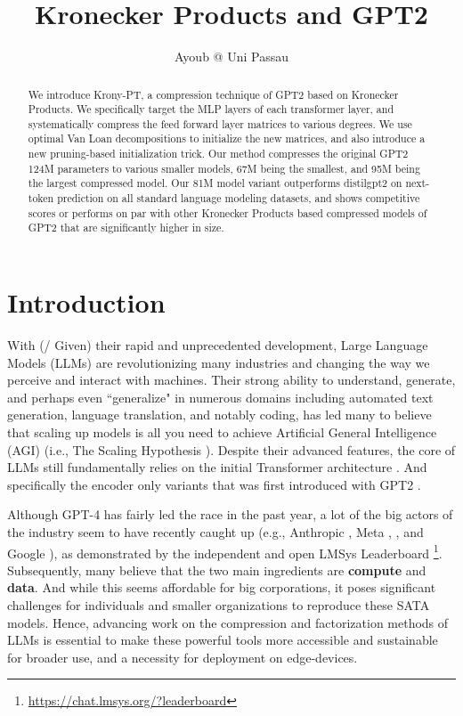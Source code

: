 \documentclass{article}
\title{Kronecker Products and GPT2}
\author{Ayoub @ Uni Passau}
\begin{document}
\maketitle

\begin{abstract}
	We introduce Krony-PT, a compression technique of GPT2 \cite{radford2019language} based on Kronecker Products. We specifically target the MLP layers of each transformer layer, and systematically compress the feed forward layer matrices to various degrees. We use optimal Van Loan decompositions to initialize the new matrices, and also introduce a new pruning-based initialization trick. Our method compresses the original GPT2 124M parameters to various smaller models, 67M being the smallest, and 95M being the largest compressed model. Our 81M model variant outperforms distilgpt2 on next-token prediction on all standard language modeling datasets, and shows competitive scores or performs on par with other Kronecker Products based compressed models of GPT2 that are significantly higher in size. 
\end{abstract}

\newpage

\tableofcontents
\newpage

\section{Introduction}
\label{sec:Introduction}

With (/ Given) their rapid and unprecedented development, Large Language Models (LLMs) are revolutionizing many industries and changing the way we perceive and interact with machines. Their strong ability to understand, generate, and perhaps even ``generalize" in numerous domains including automated text generation, language translation, and notably coding, has led many to believe that scaling up models is all you need to achieve Artificial General Intelligence (AGI) (i.e., The Scaling Hypothesis \cite{branwen2021scaling}). Despite their advanced features, the core of LLMs still fundamentally relies on the initial Transformer architecture \cite{vaswani2017attention}. And specifically the encoder only variants that was first introduced with GPT2 \cite{radford2019language}. 

Although GPT-4 \cite{achiam2023gpt} has fairly led the race in the past year, a lot of the big actors of the industry seem to have recently caught up (e.g., Anthropic \cite{claude3}, Meta \cite{llama}, \cite{llama3} , and Google \cite{reid2024gemini}), as demonstrated by the independent and open LMSys Leaderboard \footnote{\href{https://chat.lmsys.org/?leaderboard}{https://chat.lmsys.org/?leaderboard}}. Subsequently, many believe that the two main ingredients are \textbf{compute} and \textbf{data}. And while this seems affordable for big corporations, it poses significant challenges for individuals and smaller organizations to reproduce these SATA models. Hence, advancing work on the compression and factorization methods of LLMs is essential to make these powerful tools more accessible and sustainable for broader use, and a necessity for deployment on edge-devices.
\end{document}
